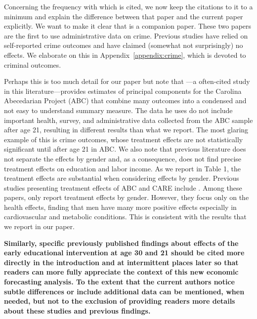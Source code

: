 \noindent Concerning the frequency with which \citet{Garcia_Heckman_Ziff_2017_Gender-Diff_UNPUBLISHED} is cited, we now keep the citations to it to a minimum and explain the difference between that paper and the current paper explicitly. We want to make it clear that \citet{Garcia_Heckman_Ziff_2017_Gender-Diff_UNPUBLISHED} is a companion paper. These two papers are the first to use administrative data on crime. Previous studies have relied on self-reported crime outcomes and have claimed (somewhat not surprisingly) no effects. We elaborate on this in Appendix~\ref{appendix:crime}, which is devoted to criminal outcomes.

\noindent Perhaps this is too much detail for our paper but note that \citet{Anderson_2008_JASA}---a often-cited study in this literature---provides estimates of principal components for the Carolina Abecedarian Project (ABC) that combine many outcomes into a condensed and not easy to understand summary measure. The data he uses do not include important health, survey, and administrative data collected from the ABC sample after age 21, resulting in different results than what we report. The most glaring example of this is crime outcomes, whose treatment effects are not statistically significant until after age 21 in ABC. We also note that previous literature does not separate the effects by gender and, as a consequence, does not find precise treatment effects on education and labor income. As we report in Table 1, the treatment effects are substantial when considering effects by gender. Previous studies presenting treatment effects of ABC and CARE include \citet{Ramey_etal_1985_Project-CARE_TiECSE,Clarke_Campbell_1998_ABC_Comparison_ECRQ,Campbell_Pungello_etal_2001_DP,Campbell_Ramey_etal_2002_ADS,Campbell_Wasik_etal_2008_ECRQ,Campbell_Conti_etal_2014_EarlyChildhoodInvestments}. Among these papers, only \citet{Campbell_Conti_etal_2014_EarlyChildhoodInvestments} report treatment effects by gender. However, they focus only on the health effects, finding that men have many more positive effects especially in cardiovascular and metabolic conditions. This is consistent with the results that we report in our paper.

\noindent \textbf{Similarly, specific previously published findings about effects of the early educational intervention at age 30 and 21 should be cited more directly in the introduction and at intermittent places later so that readers can more fully appreciate the context of this new economic forecasting analysis. To the extent that the current authors notice subtle differences or include additional data can be mentioned, when needed, but not to the exclusion of providing readers more details about these studies and previous findings.}

